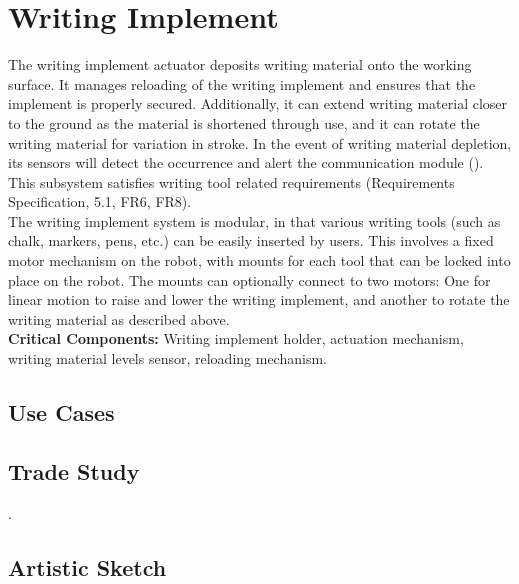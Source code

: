 
\section{Writing Implement}
\label{sec:writing_implement}
The writing implement actuator deposits writing material onto the working surface. It manages reloading of the writing implement and ensures that the implement is properly secured. Additionally, it can extend writing material closer to the ground as the material is shortened through use, and it can rotate the writing material for variation in stroke. In the event of writing material depletion, its sensors will detect the occurrence and alert the communication module (). This subsystem satisfies writing tool related requirements (Requirements Specification, 5.1, FR6, FR8).\\
The writing implement system is modular, in that various writing tools (such as chalk, markers, pens, etc.) can be easily inserted by users. This involves a fixed motor mechanism on the robot, with mounts for each tool that can be locked into place on the robot. The mounts can optionally connect to two motors: One for linear motion to raise and lower the writing implement, and another to rotate the writing material as described above. \\

\textbf{Critical Components:} Writing implement holder, actuation mechanism, writing material levels sensor, reloading mechanism. \\

\subsection{Use Cases}

\subsection{Trade Study}
. 

\subsection{Artistic Sketch}
